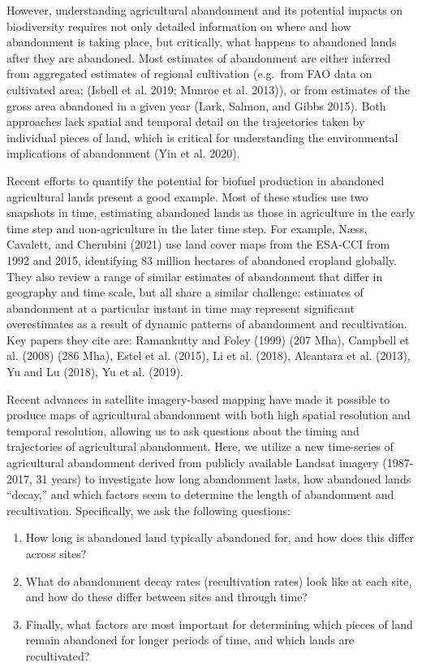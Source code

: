 \documentclass[
]{article}
\providecommand{\tightlist}{%
  \setlength{\itemsep}{0pt}\setlength{\parskip}{0pt}}
\begin{document}
However, understanding agricultural abandonment and its potential impacts on biodiversity requires not only detailed information on where and how abandonment is taking place, but critically, what happens to abandoned lands after they are abandoned.
Most estimates of abandonment are either inferred from aggregated estimates of regional cultivation (e.g.~from FAO data on cultivated area; (Isbell et al. 2019; Munroe et al. 2013)), or from estimates of the gross area abandoned in a given year (Lark, Salmon, and Gibbs 2015).
Both approaches lack spatial and temporal detail on the trajectories taken by individual pieces of land, which is critical for understanding the environmental implications of abandonment (Yin et al. 2020).

Recent efforts to quantify the potential for biofuel production in abandoned agricultural lands present a good example.
Most of these studies use two snapshots in time, estimating abandoned lands as those in agriculture in the early time step and non-agriculture in the later time step.
For example, Næss, Cavalett, and Cherubini (2021) use land cover maps from the ESA-CCI from 1992 and 2015, identifying 83 million hectares of abandoned cropland globally.
They also review a range of similar estimates of abandonment that differ in geography and time scale, but all share a similar challenge: estimates of abandonment at a particular instant in time may represent significant overestimates as a result of dynamic patterns of abandonment and recultivation.
Key papers they cite are: Ramankutty and Foley (1999) (207 Mha), Campbell et al. (2008) (286 Mha), Estel et al. (2015), Li et al. (2018), Alcantara et al. (2013), Yu and Lu (2018), Yu et al. (2019).

Recent advances in satellite imagery-based mapping have made it possible to produce maps of agricultural abandonment with both high spatial resolution and temporal resolution, allowing us to ask questions about the timing and trajectories of agricultural abandonment.
Here, we utilize a new time-series of agricultural abandonment derived from publicly available Landsat imagery (1987-2017, 31 years) to investigate how long abandonment lasts, how abandoned lands ``decay,'' and which factors seem to determine the length of abandonment and recultivation.
Specifically, we ask the following questions:

\begin{enumerate}
\def\labelenumi{\arabic{enumi}.}
\tightlist
\item
  How long is abandoned land typically abandoned for, and how does this differ across sites?
\item
  What do abandonment decay rates (recultivation rates) look like at each site, and how do these differ between sites and through time?
\item
  Finally, what factors are most important for determining which pieces of land remain abandoned for longer periods of time, and which lands are recultivated?
\end{enumerate}
\end{document}
